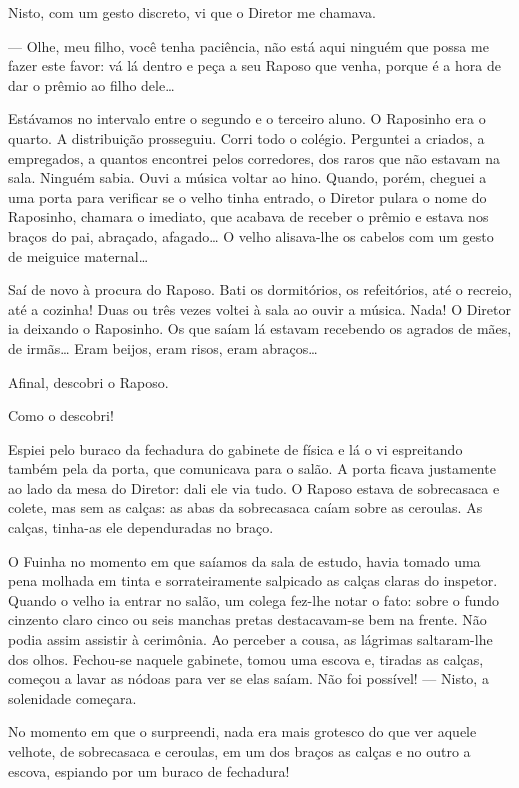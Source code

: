 Nisto, com um gesto discreto, vi que o Diretor me chamava.

--- Olhe, meu filho, você tenha paciência, não está aqui ninguém que
possa me fazer este favor: vá lá dentro e peça a seu Raposo que venha,
porque é a hora de dar o prêmio ao filho dele\ldots{}

Estávamos no intervalo entre o segundo e o terceiro aluno. O Raposinho
era o quarto. A distribuição prosseguiu. Corri todo o colégio. Perguntei
a criados, a empregados, a quantos encontrei pelos corredores, dos raros
que não estavam na sala. Ninguém sabia. Ouvi a música voltar ao hino.
Quando, porém, cheguei a uma porta para verificar se o velho tinha
entrado, o Diretor pulara o nome do Raposinho, chamara o imediato, que
acabava de receber o prêmio e estava nos braços do pai, abraçado,
afagado\ldots{} O velho alisava-lhe os cabelos com um gesto de meiguice
maternal\ldots{}

Saí de novo à procura do Raposo. Bati os dormitórios, os refeitórios,
até o recreio, até a cozinha! Duas ou três vezes voltei à sala ao ouvir
a música. Nada! O Diretor ia deixando o Raposinho. Os que saíam lá
estavam recebendo os agrados de mães, de irmãs\ldots{} Eram beijos, eram
risos, eram abraços\ldots{}

Afinal, descobri o Raposo.

Como o descobri!

Espiei pelo buraco da fechadura do gabinete de física e lá o vi
espreitando também pela da porta, que comunicava para o salão. A porta
ficava justamente ao lado da mesa do Diretor: dali ele via tudo. O
Raposo estava de sobrecasaca e colete, mas sem as calças: as abas da
sobrecasaca caíam sobre as ceroulas. As calças, tinha-as ele
dependuradas no braço.

O Fuinha no momento em que saíamos da sala de estudo, havia tomado uma
pena molhada em tinta e sorrateiramente salpicado as calças claras do
inspetor. Quando o velho ia entrar no salão, um colega fez-lhe notar o
fato: sobre o fundo cinzento claro cinco ou seis manchas pretas
destacavam-se bem na frente. Não podia assim assistir à cerimônia. Ao
perceber a cousa, as lágrimas saltaram-lhe dos olhos. Fechou-se naquele
gabinete, tomou uma escova e, tiradas as calças, começou a lavar as
nódoas para ver se elas saíam. Não foi possível! --- Nisto, a solenidade
começara.

No momento em que o surpreendi, nada era mais grotesco do que ver aquele
velhote, de sobrecasaca e ceroulas, em um dos braços as calças e no
outro a escova, espiando por um buraco de fechadura!

